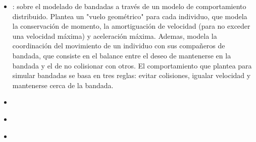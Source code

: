 \documentclass[final]{article}
\begin{document}
\begin{itemize}
    \item \citet{ReynoldsBoids}: sobre el modelado de bandadas a través de un modelo de comportamiento distribuido. Plantea un "vuelo geométrico" para cada
    individuo, que modela la conservación de momento, la amortiguación de velocidad (para no exceder una velocidad máxima) y aceleración máxima. Ademas, modela
    la coordinación del movimiento de un individuo con sus compañeros de bandada, que consiste en el balance entre el deseo de mantenerse en la bandada y el
    de no colisionar con otros. El comportamiento que plantea para simular bandadas se basa en tres reglas: evitar colisiones, igualar velocidad y mantenerse
    cerca de la bandada.
    \item \citet{SankarShepherding}
    \item \citet{NapolitanoShepherding}
    \item \citet{CovoneShepherding}
\end{itemize}



\end{document}
